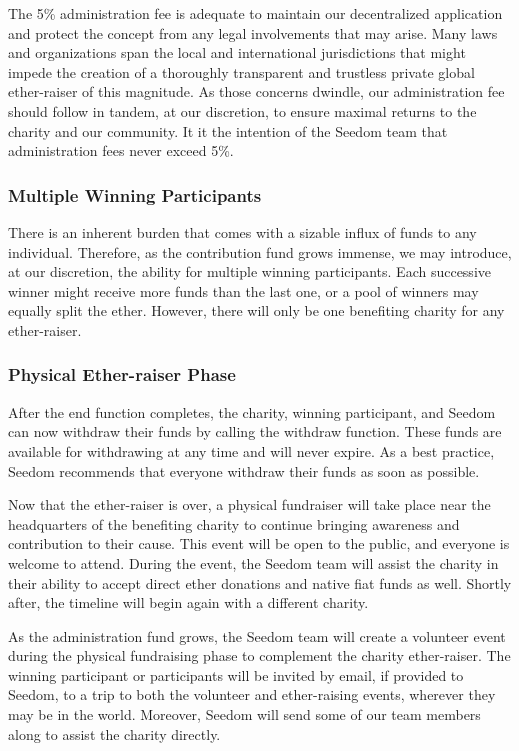 \documentclass[11pt]{article}
\begin{document}
The 5\% administration fee is adequate to maintain our decentralized application and protect the concept from any legal involvements that may arise. Many laws and organizations span the local and international jurisdictions that might impede the creation of a thoroughly transparent and trustless private global ether-raiser of this magnitude. As those concerns dwindle, our administration fee should follow in tandem, at our discretion, to ensure maximal returns to the charity and our community. It it the intention of the Seedom team that administration fees never exceed 5\%.

\subsubsection{Multiple Winning Participants}

There is an inherent burden that comes with a sizable influx of funds to any individual. Therefore, as the contribution fund grows immense, we may introduce, at our discretion, the ability for multiple winning participants. Each successive winner might receive more funds than the last one, or a pool of winners may equally split the ether. However, there will only be one benefiting charity for any ether-raiser.

\subsubsection{Physical Ether-raiser Phase}

After the end function completes, the charity, winning participant, and Seedom can now withdraw their funds by calling the withdraw function. These funds are available for withdrawing at any time and will never expire. As a best practice, Seedom recommends that everyone withdraw their funds as soon as possible.

Now that the ether-raiser is over, a physical fundraiser will take place near the headquarters of the benefiting charity to continue bringing awareness and contribution to their cause. This event will be open to the public, and everyone is welcome to attend. During the event, the Seedom team will assist the charity in their ability to accept direct ether donations and native fiat funds as well. Shortly after, the timeline will begin again with a different charity.

As the administration fund grows, the Seedom team will create a volunteer event during the physical fundraising phase to complement the charity ether-raiser. The winning participant or participants will be invited by email, if provided to Seedom, to a trip to both the volunteer and ether-raising events, wherever they may be in the world. Moreover, Seedom will send some of our team members along to assist the charity directly.
\end{document}
